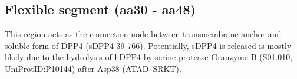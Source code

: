 \subsection{Flexible segment (aa30 - aa48)}

This region acts as the connection node between transmembrane anchor and soluble form of DPP4 (sDPP4 39-766). Potentially, sDPP4 is released is mostly likely due to the hydrolysis of hDPP4 by serine protease Granzyme B (S01.010, UniProtID:P10144) after Asp38 (ATAD~\textbar SRKT).~\cite{Song_2018} 
